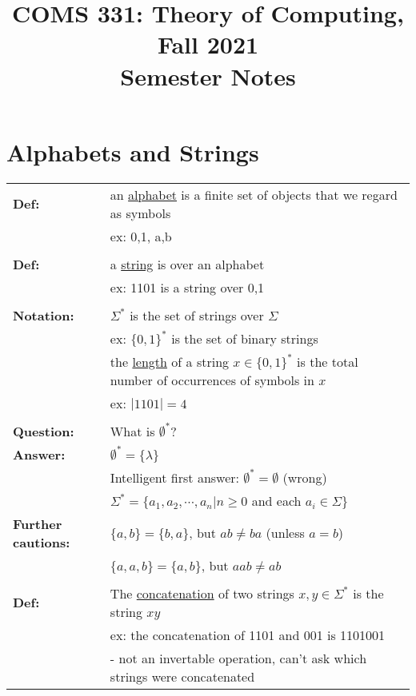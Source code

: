\documentclass[11pt]{article}
\begin{document}
\title{COMS 331: Theory of Computing, Fall 2021\\
Semester Notes\\}
\date{}
\maketitle

\section{Alphabets and Strings}

\begin{tabular}{ll}
{\bf Def:} & an \underline{alphabet} is a finite set of objects that we regard as symbols \\
& ex: {0,1}, {a,b} \\
\\
{\bf Def:} & a \underline{string} is over an alphabet \\
& ex: 1101 is a string over {0,1} \\
\\
{\bf Notation:} & $\Sigma^*$ is the set of strings over $\Sigma$ \\
& ex: $\{0,1\}^*$ is the set of binary strings \\
& the \underline{length} of a string $x \in \{0,1\}^*$ is the total number of occurrences of symbols in $x$\\
& ex: $|1101|=4$ \\
\\
{\bf Question:} & What is $\emptyset^*$? \\
{\bf Answer:} & $\emptyset^*=\{\lambda\}$ \\
& Intelligent first answer: $\emptyset^* = \emptyset$ (wrong)\\
& $\Sigma^*=\{a_1,a_2,\cdots,a_n|n \geqslant 0$ and each $a_i\in\Sigma\}$\\
{\bf Further cautions:} & $\{a,b\}=\{b,a\}$, but $ab \neq ba$ (unless $a=b$) \\
& $\{a,a,b\}=\{a,b\}$, but $aab\neq ab$ \\
\\
{\bf Def:} & The \underline{concatenation} of two strings $x,y\in\Sigma^*$ is the string $xy$ \\
& ex: the concatenation of 1101 and 001 is 1101001 \\
& - not an invertable operation, can't ask which strings were concatenated \\
\end{tabular}
\end{document}
